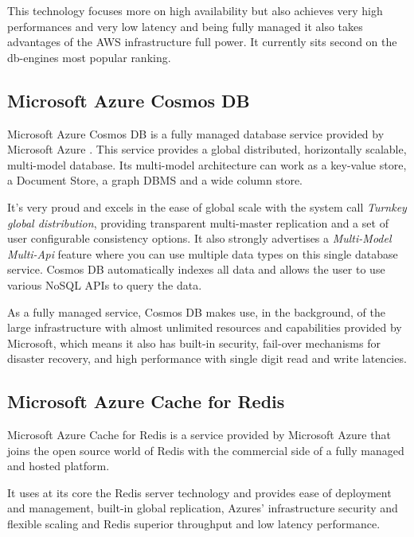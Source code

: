 This technology focuses more on high availability but also achieves very high performances and very low latency and being fully managed it also takes advantages of the \gls{AWS} infrastructure full power. It currently sits second on the db-engines \cite{db-engine:2} most popular ranking.

\subsection{Microsoft Azure Cosmos DB}
\label{ssec:microsoft_azure_cosmos_db}

Microsoft Azure Cosmos DB \cite{cosmos:1} is a fully managed database service provided by Microsoft Azure \cite{azure:1}. This service provides a global distributed, horizontally scalable, multi-model database. Its multi-model architecture can work as a key-value store, a Document Store, a graph \gls{DBMS} and a wide column store.

It's very proud and excels in the ease of global scale with the system call \textit{Turnkey global distribution}, providing transparent multi-master replication and a set of user configurable consistency options. It also strongly advertises a \textit{Multi-Model Multi-Api} feature where you can use multiple data types on this single database service. Cosmos DB automatically indexes all data and allows the user to use various NoSQL APIs to query the data.

As a fully managed service, Cosmos DB makes use, in the background, of the large infrastructure with almost unlimited resources and capabilities provided by Microsoft, which means it also has built-in security, fail-over mechanisms for disaster recovery, and high performance with single digit read and write latencies.

\subsection{Microsoft Azure Cache for Redis}
\label{ssec:microsoft_azure_cache_for_redis}

Microsoft Azure Cache for Redis \cite{cache-for-redis:1} is a service provided by Microsoft Azure that joins the open source world of Redis with the commercial side of a fully managed and hosted platform.

It uses at its core the Redis server technology and provides ease of deployment and management, built-in global replication, Azures' infrastructure security and flexible scaling and Redis superior throughput and low latency performance.

